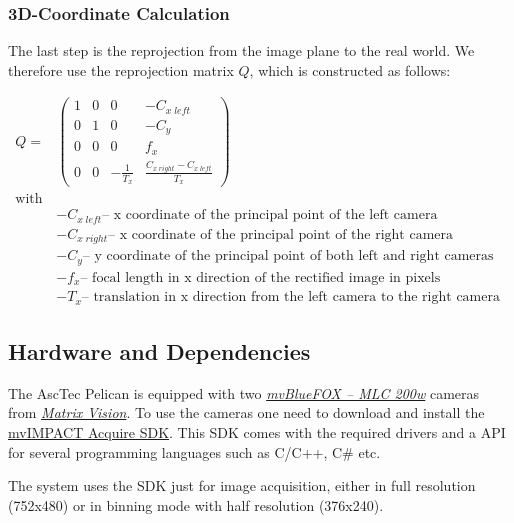 \documentclass[11pt]{article}
\begin{document}
\subsubsection{3D-Coordinate Calculation}
The last step is the reprojection from the image plane to the real world. We therefore use the reprojection matrix $Q$, which is constructed as follows:

\begin{align*}
Q=&
\begin{pmatrix}
1 & 0 & 0 & -C_{x\;left} \\
0 & 1 & 0 & -C_{y} \\
0 & 0 & 0 & f_x \\
0 & 0 & -\frac{1}{T_x} & \frac{C_{x\;right}-C_{x\;left}}{T_x}
\end{pmatrix}\\
\textrm{with}\\
&-C_{x\;left} \textrm{-- x coordinate of the principal point of the left camera }\\
&-C_{x\;right} \textrm{-- x coordinate of the principal point of the right camera }\\
&-C_{y} \textrm{-- y coordinate of the principal point of both left and right cameras  }\\
&-f_x \textrm{-- focal length in x direction of the rectified image in pixels}\\
&-T_x \textrm{-- translation in x direction from the left camera to the right camera }
\end{align*}



\subsection{Hardware and Dependencies}  
The AscTec Pelican is equipped with two  \emph{\href{http://www.matrix-vision.com/USB2.0-single-board-camera-mvbluefox-mlc.html?camera=mvBlueFOX-MLC200wC&selectInterface=Alle&selectMpixels=Alle&selectFps=Alle&selectSensor=Alle&selectColor=Alle&selectSize=Alle&selectShutter=Alle&selectModel=Alle&col=1&row=0}{mvBlueFOX -- MLC 200w}} cameras from \emph{\href{http://www.matrix-vision.com/home-en.html}{Matrix Vision}}. To use the cameras one need to download and install the \href{http://www.matrix-vision.com/programming-interface-mvimpact-acquire.html}{mvIMPACT Acquire SDK}. This SDK comes with the required drivers and a API for several programming languages such as C/C++, C\# etc. 

The system uses the SDK just for image acquisition, either in full resolution (752x480) or in binning mode with half resolution (376x240).
\end{document}
